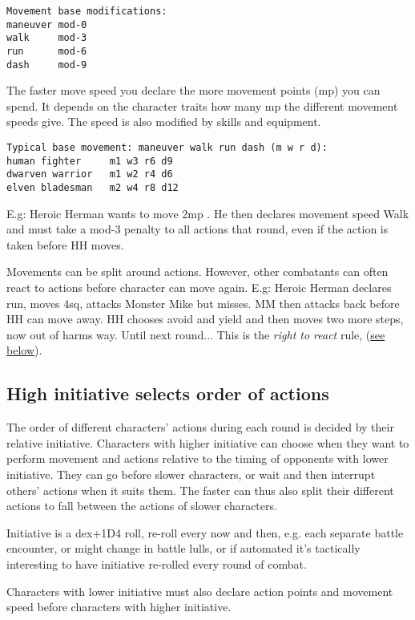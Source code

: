 \small \begin{verbatim}
Movement base modifications:
maneuver mod-0
walk     mod-3
run      mod-6
dash     mod-9
\end{verbatim} \normalsize

The faster move speed you declare the more movement points (mp) you can spend. It depends on the character traits how many mp the different movement speeds give. The speed is also modified by skills and equipment.

\small \begin{verbatim}
Typical base movement: maneuver walk run dash (m w r d):
human fighter     m1 w3 r6 d9
dwarven warrior   m1 w2 r4 d6
elven bladesman   m2 w4 r8 d12
\end{verbatim} \normalsize

E.g: Heroic Herman wants to move 2mp . He then declares movement speed Walk and must take a mod-3 penalty to all actions that round, even if the action is taken before HH moves.

Movements can be split around actions. However, other combatants can often react to actions before character can move again. E.g: Heroic Herman declares run, moves 4sq, attacks Monster Mike but misses. MM then attacks back before HH can move away. HH chooses avoid and yield and then moves two more steps, now out of harms way. Until next round... This is the \emph{right to react} rule, (\hyperref[righttoreact]{see below}).


\subsection*{High initiative selects order of actions}
The order of different characters' actions during each round is decided by their relative initiative. Characters with higher initiative can choose when they want to perform movement and actions relative to the timing of opponents with lower initiative. They can go before slower characters, or wait and then interrupt others' actions when it suits them. The faster can thus also split their different actions to fall between the actions of slower characters.

Initiative is a dex+1D4 roll, re-roll every now and then, e.g. each separate battle encounter, or might change in battle lulls, or if automated it's tactically interesting to have initiative re-rolled every round of combat.

Characters with lower initiative must also declare action points and movement speed before characters with higher initiative.


